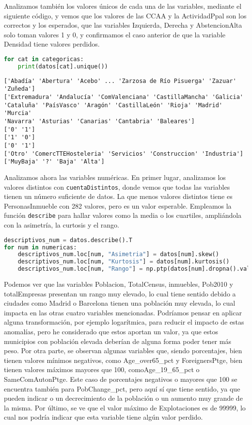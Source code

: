 \documentclass[a4paper,onecolumn]{extarticle}
\begin{document}
\begin{sloppypar}
Analizamos también los valores únicos de cada una de las variables, mediante el siguiente código, y vemos que los valores de las CCAA y la ActividadPpal son los
correctos y los esperados, que las variables Izquierda, Derecha y AbstencionAlta solo toman valores 1 y 0, y confirmamos el caso anterior de que la variable 
Densidad tiene valores perdidos.
\begin{lstlisting}[language=Python,numbers=none]
for cat in categoricas:
    print(datos[cat].unique())
\end{lstlisting}
\begin{lstlisting}[numbers=none]
['Abadía' 'Abertura' 'Acebo' ... 'Zarzosa de Río Pisuerga' 'Zazuar'
'Zuñeda']
['Extremadura' 'Andalucía' 'ComValenciana' 'CastillaMancha' 'Galicia'
'Cataluña' 'PaísVasco' 'Aragón' 'CastillaLeón' 'Rioja' 'Madrid' 'Murcia'
'Navarra' 'Asturias' 'Canarias' 'Cantabria' 'Baleares']
['0' '1']
['1' '0']
['0' '1']
['Otro' 'ComercTTEHosteleria' 'Servicios' 'Construccion' 'Industria']
['MuyBaja' '?' 'Baja' 'Alta']
\end{lstlisting}

Analizamos ahora las variables numéricas. En primer lugar, analizamos los valores distintos con \texttt{cuentaDistintos}, donde vemos que todas las variables 
tienen un número suficiente de datos. La que menos valores distintos tiene es PersonasInmueble con 282 valores, pero es un valor esperable. Empleamos 
la función \texttt{describe} para hallar valores como la media o los cuartiles, ampliándola con la asimetría, la curtosis y el rango.
\begin{lstlisting}[language=Python]
descriptivos_num = datos.describe().T
for num in numericas:
    descriptivos_num.loc[num, "Asimetria"] = datos[num].skew()
    descriptivos_num.loc[num, "Kurtosis"] = datos[num].kurtosis()
    descriptivos_num.loc[num, "Rango"] = np.ptp(datos[num].dropna().values)
\end{lstlisting}

Podemos ver que las variables Poblacion, TotalCensus, inmuebles, Pob2010 y totalEmpresas presentan un rango muy elevado, lo cual tiene sentido debido a
ciudades como Madrid o Barcelona tienen una población muy elevada, lo cual impacta en las otras cuatro variables mencionadas. Podríamos pensar en aplicar 
alguna transformación, por ejemplo logarítmica, para reducir el impacto de estas anomalías, pero he considerado que estos aportan un valor, ya que estos 
municipios con población elevada deberían de alguna forma poder tener más peso. Por otra parte, se observan algunas variables que, siendo porcentajes, bien 
tienen valores mínimos negativos, como Age\_over65\_pct y ForeignersPtge, bien tienen valores máximos mayores que 100, comoAge\_19\_65\_pct o SameComAutonPtge. 
Este caso de porcentajes negativos o mayores que 100 se encuentra también para PobChange\_pct, pero aquí sí que tiene sentido, ya que pueden indicar o un 
decrecimiento de la población o un aumento muy grande de la misma. Por último, se ve que el valor máximo de Explotaciones es de 99999, lo cual nos podría 
indicar que esta variable tiene algún valor perdido.


\end{sloppypar}
\end{document}

